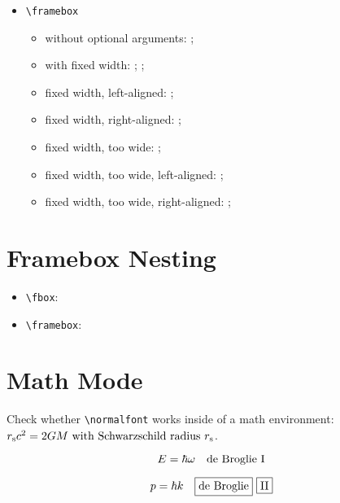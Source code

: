 \documentclass{article}
\begin{document}
\begin{itemize}
\item \texttt{\textbackslash framebox}
  \begin{itemize}
  \item without optional arguments: ;
  \item with fixed width: ;  ;
  \item fixed width, left-aligned: ;
  \item fixed width, right-aligned: ;
  \item fixed width, too wide: ;
  \item fixed width, too wide, left-aligned: ;
  \item fixed width, too wide, right-aligned: ;
  \end{itemize}
\end{itemize}


\section{Framebox Nesting}

\begin{itemize}
\item \texttt{\textbackslash fbox}:

\item \texttt{\textbackslash framebox}:
\end{itemize}


\section{Math Mode}

Check whether \texttt{\textbackslash normalfont} works inside of a
math environment:
$r_{\mathrm{s}} c^2 = 2 G M\textnormal{ with Schwarzschild radius}~r_{\mathrm{s}}$.

\begin{equation}
    E = \hbar \omega\quad\makebox{de~Broglie}\ \mbox{I}
\end{equation}

\[
    p = \hbar k\quad\framebox{de~Broglie}\ \fbox{II}
\]
\end{document}
